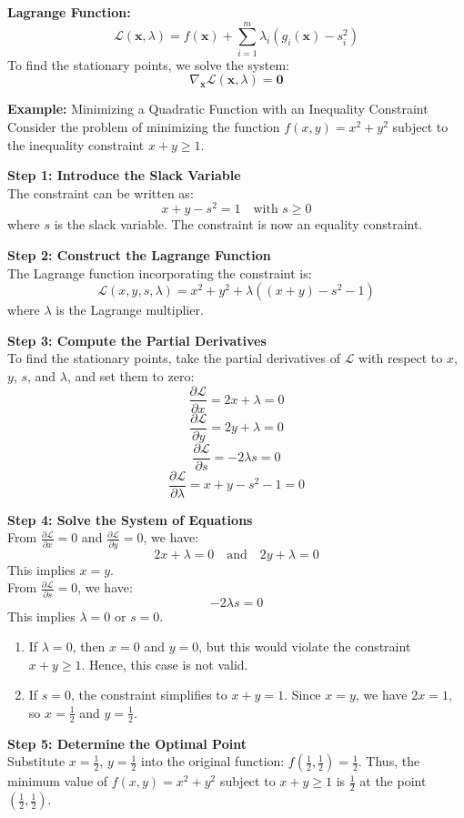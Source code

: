 \documentclass[]{article}
\begin{document}
	\textbf{Lagrange Function:}
	$$
	\mathcal{L}(\mathbf{x}, \lambda)
	= f(\mathbf{x}) + \sum_{i=1}^m \lambda_i \left( g_i(\mathbf{x}) - s_i^2 \right)
	$$
	To find the stationary points, we solve the system:
	$$
	\nabla_\mathbf{x} \mathcal{L}(\mathbf{x}, \lambda) = \mathbf{0}
	$$
	
	\textbf{Example:}
	Minimizing a Quadratic Function with an Inequality Constraint\\
	Consider the problem of minimizing the function $f(x, y) = x^2 + y^2$ subject to the inequality constraint $x + y \geq 1$.
	
	\textbf{Step 1: Introduce the Slack Variable}\\
	The constraint can be written as:
	$$
	x + y - s^2 = 1 \quad \text{with } s \geq 0
	$$
	where $s$ is the slack variable.
	The constraint is now an equality constraint.
	
	\textbf{Step 2: Construct the Lagrange Function}\\
	The Lagrange function incorporating the constraint is:
	$$
	\mathcal{L}(x, y, s, \lambda) = x^2 + y^2 + \lambda \left( (x + y) - s^2 - 1 \right)
	$$
	where $\lambda$ is the Lagrange multiplier.
	
	\textbf{Step 3: Compute the Partial Derivatives}\\
	To find the stationary points, take the partial derivatives of $\mathcal{L}$ with respect to $x$, $y$, $s$, and $\lambda$, and set them to zero:
	$$
	\frac{\partial \mathcal{L}}{\partial x} = 2x + \lambda = 0
	$$
	$$
	\frac{\partial \mathcal{L}}{\partial y} = 2y + \lambda = 0
	$$
	$$
	\frac{\partial \mathcal{L}}{\partial s} = -2\lambda s = 0
	$$
	$$
	\frac{\partial \mathcal{L}}{\partial \lambda} = x + y - s^2 - 1 = 0
	$$
	
	\textbf{Step 4: Solve the System of Equations}\\
	From $\frac{\partial \mathcal{L}}{\partial x} = 0$ and $\frac{\partial \mathcal{L}}{\partial y} = 0$, we have:
	$$
	2x + \lambda = 0 \quad \text{and} \quad 2y + \lambda = 0
	$$
	This implies $x = y$.\\
	From $\frac{\partial \mathcal{L}}{\partial s} = 0$, we have:
	$$
	-2\lambda s = 0
	$$
	This implies $\lambda = 0$ or $s = 0$. 
	
	\begin{enumerate}
		\item If $\lambda = 0$, then $x = 0$ and $y = 0$, but this would violate the constraint $x + y \geq 1$.
		Hence, this case is not valid.
		\item If $s = 0$, the constraint simplifies to $x + y = 1$.
		Since $x = y$, we have $2x = 1$, so $x = \frac{1}{2}$ and $y = \frac{1}{2}$.
	\end{enumerate}
	
	\textbf{Step 5: Determine the Optimal Point}\\
	Substitute $x = \frac{1}{2}$, $y = \frac{1}{2}$ into the original function:
	$f\left(\frac{1}{2}, \frac{1}{2}\right) = \frac{1}{2}$.
	Thus, the minimum value of $f(x, y) = x^2 + y^2$ subject to $x + y \geq 1$ is $\frac{1}{2}$ at the point $\left(\frac{1}{2}, \frac{1}{2}\right)$.
	
\end{document}
